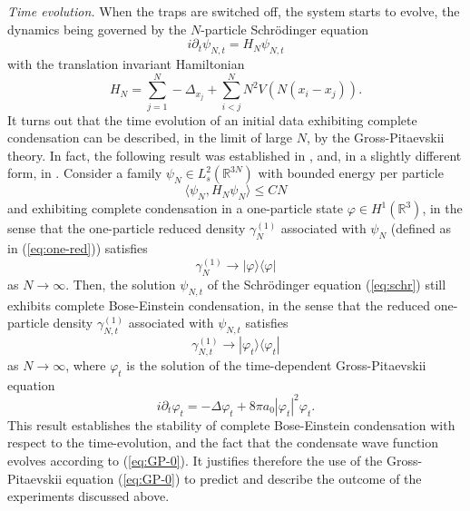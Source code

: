 \documentclass[11pt,a4paper]{article}
\newcommand{\bR}{{\mathbb R}}
\begin{document}
{\it Time evolution.} 
When the traps are switched off, the system starts to evolve, the dynamics being governed by the $N$-particle Schr\"odinger equation 
\begin{equation}\label{eq:schr} i \partial_t \psi_{N,t} = H_N \psi_{N,t} \end{equation}
with the translation invariant Hamiltonian
\begin{equation}\label{eq:ham-1} H_N = \sum_{j=1}^N -\Delta_{x_j} +
\sum_{i<j}^N N^2 V(N (x_i - x_j)). \end{equation}
It turns out that the time evolution of an initial data exhibiting complete condensation can be described, in the limit of large $N$, by the Gross-Pitaevskii theory. In fact, the following result was established in 
\cite{ESY0,ESY1,ESY2,ESY3,ESY4}, and, in a slightly different form, in \cite{P}. Consider a family $\psi_N \in L^2_s (\bR^{3N})$ with bounded energy per particle
\[ \langle \psi_N , H_N \psi_N \rangle \leq C N \]
and exhibiting complete condensation in a one-particle state $\varphi \in H^1 (\bR^3)$, in the sense that the one-particle reduced density $\gamma^{(1)}_N$ associated with $\psi_N$ (defined as in (\ref{eq:one-red})) satisfies
\[ \gamma_N^{(1)} \to |\varphi \rangle \langle \varphi| \] 
as $N \to \infty$. Then, the solution $\psi_{N,t}$ of the Schr\"odinger equation (\ref{eq:schr}) still exhibits complete Bose-Einstein condensation, in the sense that the reduced one-particle density $\gamma_{N,t}^{(1)}$ associated with $\psi_{N,t}$ satisfies 
\begin{equation}\label{eq:conv-GP} \gamma_{N,t}^{(1)} \to |\varphi_t \rangle \langle \varphi_t| \end{equation}
as $N \to \infty$, where $\varphi_t$ is the solution of the time-dependent Gross-Pitaevskii equation
\begin{equation}\label{eq:GP-0} i\partial_t \varphi_t = -\Delta \varphi_t +
8\pi a_0 |\varphi_t|^2 \varphi_t. \end{equation}
This result establishes the stability of complete Bose-Einstein condensation with respect to the time-evolution, and the fact that the condensate wave function evolves according to (\ref{eq:GP-0}). It justifies therefore the use of the Gross-Pitaevskii equation (\ref{eq:GP-0}) to predict and describe the outcome of the experiments discussed above. 
\end{document}
